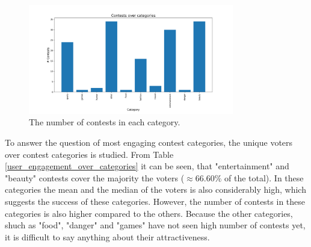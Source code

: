     \begin{figure}[h] 
        \begin{center}
            \includegraphics[width=0.8\textwidth]{Images/contests_over_categories.png}
            \caption{The number of contests in each category.}
            \label{contests_over_categories}
        \end{center}
    \end{figure}
    
    To answer the question of most engaging contest categories, the unique voters over contest categories is studied. From Table \ref{user_engagement_over_categories} it can be seen, that "entertainment" and "beauty" contests cover the majority the voters ($\approx 66.60 \%$ of the total). In these categories the mean and the median of the voters is also considerably high, which suggests the success of these categories. However, the number of contests in these categories is also higher compared to the others. Because the other categories, shuch as "food", "danger" and "games" have not seen high number of contests yet, it is difficult to say anything about their attractiveness.

